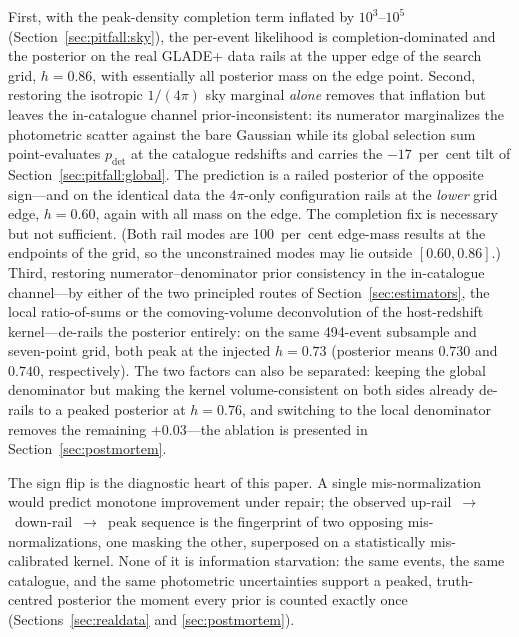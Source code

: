 First, with the peak-density completion term inflated by $10^3$--$10^5$ (Section~\ref{sec:pitfall:sky}), the per-event likelihood is completion-dominated and the posterior on the real GLADE+ data rails at the upper edge of the search grid, $h = 0.86$, with essentially all posterior mass on the edge point. %
Second, restoring the isotropic $1/(4\pi)$ sky marginal \emph{alone} removes that inflation but leaves the in-catalogue channel prior-inconsistent: its numerator marginalizes the photometric scatter against the bare Gaussian while its global selection sum point-evaluates $p_{\mathrm{det}}$ at the catalogue redshifts and carries the $-17$~per~cent tilt of Section~\ref{sec:pitfall:global}. %
The prediction is a railed posterior of the opposite sign---and on the identical data the $4\pi$-only configuration rails at the \emph{lower} grid edge, $h = 0.60$, again with all mass on the edge. %
The completion fix is necessary but not sufficient. (Both rail modes are 100~per~cent edge-mass results at the endpoints of the grid, so the unconstrained modes may lie outside $[0.60,0.86]$.) %
Third, restoring numerator--denominator prior consistency in the in-catalogue channel---by either of the two principled routes of Section~\ref{sec:estimators}, the local ratio-of-sums or the comoving-volume deconvolution of the host-redshift kernel---de-rails the posterior entirely: on the same 494-event subsample and seven-point grid, both peak at the injected $h = 0.73$ (posterior means $0.730$ and $0.740$, respectively). %
The two factors can also be separated: keeping the global denominator but making the kernel volume-consistent on both sides already de-rails to a peaked posterior at $h = 0.76$, and switching to the local denominator removes the remaining $+0.03$---the ablation is presented in Section~\ref{sec:postmortem}. %

The sign flip is the diagnostic heart of this paper. A single mis-normalization would predict monotone improvement under repair; the observed up-rail~$\to$~down-rail~$\to$~peak sequence is the fingerprint of two opposing mis-normalizations, one masking the other, superposed on a statistically mis-calibrated kernel. None of it is information starvation: the same events, the same catalogue, and the same photometric uncertainties support a peaked, truth-centred posterior the moment every prior is counted exactly once (Sections~\ref{sec:realdata} and \ref{sec:postmortem}).
